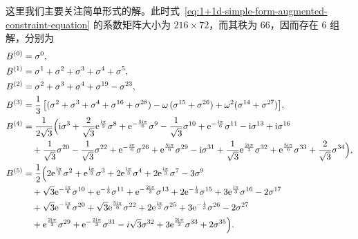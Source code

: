 这里我们主要关注简单形式的解。此时式~\eqref{eq:1+1d-simple-form-augmented-constraint-equation} 的系数矩阵大小为 $216\times72$，而其秩为 66，因而存在 6 组解，分别为
\begin{align}
  B^{(0)} &= \sigma^0, \notag \\
  B^{(1)} &= \sigma^1 + \sigma^2 + \sigma^3 + \sigma^4 + \sigma^5, \notag \\
  B^{(2)} &= \sigma^2 + \sigma^3 + \sigma^4 + \sigma^{19} - \sigma^{23}, \notag \\
  B^{(3)} &= \frac13 \, \bigl[
        (\sigma^2 + \sigma^3 + \sigma^4 + \sigma^{16} + \sigma^{28})
      - \omega \, (\sigma^{15} + \sigma^{26})
      + \omega^2  (\sigma^{14} + \sigma^{27})
    \bigr], \notag \\
  B^{(4)} &= \frac{1}{2\sqrt{3}} \Bigl(
        \mathrm{i} \sigma^3
      + \frac{2}{\sqrt{3}} \mathrm{e}^{\frac{\mathrm{i}\pi}{3}} \sigma^8
      + \mathrm{e}^{-\frac{5 \mathrm{i}\pi}{6}} \sigma^9
      - \frac{1}{\sqrt{3}} \sigma^{10}
      + \mathrm{e}^{-\frac{\mathrm{i}\pi}{6}} \sigma^{11}
      - \mathrm{i} \sigma^{13}
      + \mathrm{i} \sigma^{16} \notag \\
    &\quad {}
      + \frac{1}{\sqrt{3}} \sigma^{20}
      - \frac{1}{\sqrt{3}} \sigma^{22}
      + \mathrm{e}^{-\frac{\mathrm{i}\pi}{6}} \sigma^{26}
      + \mathrm{e}^{\frac{5 \mathrm{i}\pi}{6}} \sigma^{29}
      - \mathrm{i} \sigma^{31}
      + \frac{1}{\sqrt{3}} \mathrm{e}^{\frac{2\mathrm{i}\pi}{3}} \sigma^{32}
      + \mathrm{e}^{\frac{5 \mathrm{i}\pi}{6}} \sigma^{33}
      + \frac{2}{\sqrt{3}} \sigma^{34}
    \Bigr), \notag \\
  B^{(5)} &= \frac12 \Bigl(
        2 \mathrm{e}^{\frac{\mathrm{i}\pi}{3}} \sigma^2
      + \mathrm{e}^{\frac{\mathrm{i}\pi}{3}} \sigma^3
      + 2 \mathrm{e}^{\frac{\mathrm{i}\pi}{3}} \sigma^4
      + 2 \mathrm{e}^{\frac{\mathrm{i}\pi}{3}} \sigma^7
      - 3 \sigma^9 \notag \\
    &\quad {}
      + \sqrt{3} \mathrm{e}^{-\frac{\mathrm{i}\pi}{6}} \sigma^{10}
      + \mathrm{e}^{-\frac{\mathrm{i}}{3}} \sigma^{11}
      + \mathrm{e}^{-\frac{2\mathrm{i}\pi}{3}} \sigma^{13}
      + 2 \mathrm{e}^{-\frac{\mathrm{i}}{3}} \sigma^{15}
      + 3 \mathrm{e}^{\frac{\mathrm{i}\pi}{3}} \sigma^{16}
      - 2 \sigma^{17} \notag \\
    &\quad {}
      + \sqrt{3} \mathrm{e}^{-\frac{\mathrm{i}\pi}{6}} \sigma^{20}
      + \sqrt{3} \mathrm{e}^{\frac{5\mathrm{i}\pi}{6}} \sigma^{22}
      + 2 \mathrm{e}^{\frac{\mathrm{i}\pi}{3}} \sigma^{25}
      + 3 \mathrm{e}^{-\frac{\mathrm{i}}{3}} \sigma^{26}
      - 2 \sigma^{27} \notag \\
    &\quad {}
      + \mathrm{e}^{\frac{2\mathrm{i}\pi}{3}} \sigma^{29}
      + \mathrm{e}^{-\frac{2\mathrm{i}\pi}{3}} \sigma^{31}
      - i \sqrt{3} \sigma^{32}
      + 3 \mathrm{e}^{\frac{2\mathrm{i}\pi}{3}} \sigma^{33}
      + 2 \sigma^{35}
    \Bigr).
\end{align}

